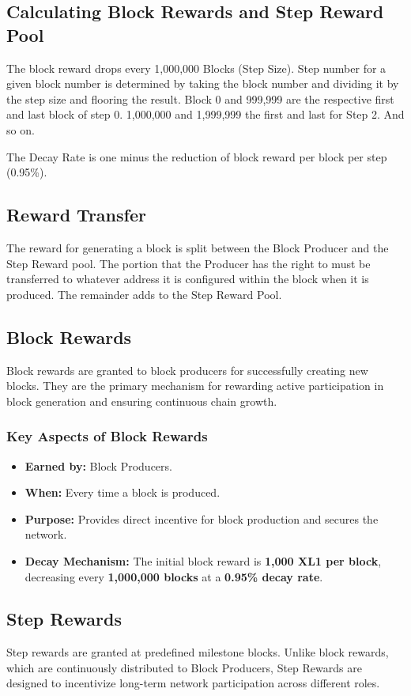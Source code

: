 \documentclass{article}
\begin{document}
\subsection{Calculating Block Rewards and Step Reward Pool}
The block reward drops every 1,000,000 Blocks (Step Size). Step number for a given block number is determined by taking the block number and dividing it by the step size and flooring the result. Block 0 and 999,999 are the respective first and last block of step 0. 1,000,000 and 1,999,999 the first and last for Step 2. And so on. 

The Decay Rate is one minus the reduction of block reward per block per step (0.95\%).

\subsection{Reward Transfer}
The reward for generating a block is split between the Block Producer and the Step Reward pool. The portion that the Producer has the right to must be transferred to whatever address it is configured within the block when it is produced. The remainder adds to the Step Reward Pool. 

\subsection{Block Rewards}
Block rewards are granted to block producers for successfully creating new blocks. They are the primary mechanism for rewarding active participation in block generation and ensuring continuous chain growth. 

\subsubsection{Key Aspects of Block Rewards}
\begin{itemize}
    \item \textbf{Earned by:} Block Producers.
    \item \textbf{When:} Every time a block is produced.
    \item \textbf{Purpose:} Provides direct incentive for block production and secures the network.
    \item \textbf{Decay Mechanism:} The initial block reward is \textbf{1,000 XL1 per block}, decreasing every \textbf{1,000,000 blocks} at a \textbf{0.95\% decay rate}.
\end{itemize}

\subsection{Step Rewards}
Step rewards are granted at predefined milestone blocks. Unlike block rewards, which are continuously distributed to Block Producers, Step Rewards are designed to incentivize long-term network participation across different roles. 
\end{document}
